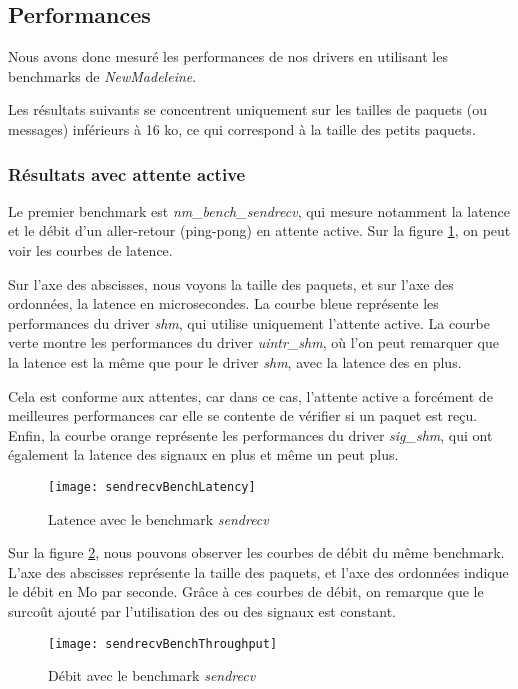 \subsection{Performances}

Nous avons donc mesuré les performances de nos drivers en utilisant les benchmarks de \emph{NewMadeleine}.

Les résultats suivants se concentrent uniquement sur les tailles de paquets (ou messages) inférieurs à 16 ko,
ce qui correspond à la taille des petits paquets.

\subsubsection{Résultats avec attente active}

Le premier benchmark est \emph{nm_bench_sendrecv}, qui mesure notamment la latence et le débit d'un aller-retour (ping-pong) en attente active.
Sur la figure \ref{fig:sendrecvBenchLatency}, on peut voir les courbes de latence.

Sur l'axe des abscisses, nous voyons la taille des paquets, et sur l'axe des ordonnées, la latence en microsecondes.
La courbe bleue représente les performances du driver \emph{shm}, qui utilise uniquement l'attente active.
La courbe verte montre les performances du driver \emph{uintr_shm},
où l'on peut remarquer que la latence est la même que pour le driver \emph{shm},
avec la latence des \uintr{} en plus.

Cela est conforme aux attentes, car dans ce cas, l'attente active a forcément de meilleures performances car elle se contente de vérifier si un paquet est reçu.
Enfin, la courbe orange représente les performances du driver \emph{sig_shm}, qui ont également la latence des signaux en plus et même un peut plus.

\begin{figure}[H]
  \texttt{[image: sendrecvBenchLatency]}
  \caption{Latence avec le benchmark \emph{sendrecv}}
  \label{fig:sendrecvBenchLatency}
\end{figure}

Sur la figure \ref{fig:sendrecvBenchThroughput}, nous pouvons observer les courbes de débit du même benchmark.
L'axe des abscisses représente la taille des paquets, et l'axe des ordonnées indique le débit en Mo par seconde.
Grâce à ces courbes de débit, on remarque que le surcoût ajouté par l'utilisation des \uintr{} ou des signaux est constant.

\begin{figure}[H]
  \texttt{[image: sendrecvBenchThroughput]}
  \caption{Débit avec le benchmark \emph{sendrecv}}
  \label{fig:sendrecvBenchThroughput}
\end{figure}

